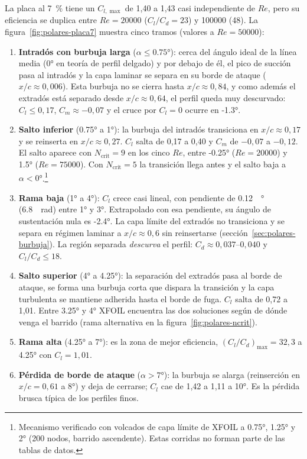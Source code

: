 La placa al \SI{7}{\percent} tiene un $C_{l,\max}$ de 1,40 a 1,43 casi independiente de
$Re$, pero su eficiencia se duplica entre $Re=\num{20000}$ ($C_l/C_d=23$) y \num{100000}
(48). La figura~\ref{fig:polares-placa7} muestra cinco tramos (valores a
$Re=\num{50000}$):
\begin{enumerate}
  \item \textbf{Intradós con burbuja larga} ($\alpha\le\ang{0.75}$): cerca del ángulo
        ideal de la línea media (\ang{0} en teoría de perfil delgado) y por debajo de él, el pico de succión pasa al intradós y
        la capa laminar se separa en su borde de ataque ($x/c\approx0{,}006$). Esta burbuja
        no se cierra hasta $x/c\approx0{,}84$, y como además el extradós está separado
        desde $x/c\approx0{,}64$, el perfil queda muy descurvado: $C_l\le0{,}17$,
        $C_m\approx-0{,}07$ y el cruce por $C_l=0$ ocurre en \ang{-1.3}.
  \item \textbf{Salto inferior} (\ang{0.75} a \ang{1}): la burbuja del intradós
        transiciona en $x/c\approx0{,}17$ y se reinserta en $x/c\approx0{,}27$. $C_l$ salta
        de 0,17 a 0,40 y $C_m$ de $-0{,}07$ a $-0{,}12$. El salto aparece con
        $N_{\text{crit}}=9$ en los cinco $Re$, entre \ang{-0.25} ($Re=\num{20000}$) y
        \ang{1.5} ($Re=\num{75000}$). Con $N_{\text{crit}}=5$ la transición llega antes y
        el salto baja a $\alpha<\ang{0}$.\footnote{Mecanismo verificado con volcados de
        capa límite de XFOIL a \ang{0.75}, \ang{1.25} y \ang{2} (200 nodos, barrido
        ascendente). Estas corridas no forman parte de las tablas de datos.}
  \item \textbf{Rama baja} (\ang{1} a \ang{4}): $C_l$ crece casi lineal, con pendiente de
        \SI{0.12}{\per\degree} (\SI{6.8}{\per\radian}) entre \ang{1} y \ang{3}. Extrapolado
        con esa pendiente, su ángulo de sustentación nula es \ang{-2.4}. La capa límite del
        extradós no transiciona y se separa en régimen laminar a $x/c\approx0{,}6$ sin
        reinsertarse (sección~\ref{sec:polares-burbuja}). La región separada
        \emph{descurva} el perfil: $C_d\approx0{,}037$--$0{,}040$ y $C_l/C_d\le18$.
  \item \textbf{Salto superior} (\ang{4} a \ang{4.25}): la separación del extradós pasa
        al borde de ataque, se forma una burbuja corta que dispara la transición y la capa
        turbulenta se mantiene adherida hasta el borde de fuga. $C_l$ salta de 0,72 a
        1,01. Entre \ang{3.25} y \ang{4} XFOIL encuentra las dos soluciones según de dónde
        venga el barrido (rama alternativa en la figura~\ref{fig:polares-ncrit}).
  \item \textbf{Rama alta} (\ang{4.25} a \ang{7}): es la zona de mejor eficiencia,
        $(C_l/C_d)_{\max}=32{,}3$ a \ang{4.25} con $C_l=1{,}01$.
  \item \textbf{Pérdida de borde de ataque} ($\alpha>\ang{7}$): la burbuja se alarga
        (reinserción en $x/c=0{,}61$ a \ang{8}) y deja de cerrarse; $C_l$ cae de 1,42 a
        1,11 a \ang{10}. Es la pérdida brusca típica de los perfiles finos.
\end{enumerate}

